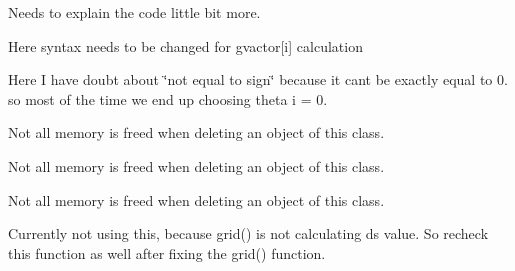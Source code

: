 
\begin{DoxyRefList}
\item[\label{bug__bug000002}%
\hypertarget{bug__bug000002}{}%
File \hyperlink{diffusionfluxinterface_8h}{diffusionfluxinterface.h} ]Needs to explain the code little bit more.  
\item[\label{bug__bug000003}%
\hypertarget{bug__bug000003}{}%
Member \hyperlink{classdiffusionfluxinterface_a30feb61f31b2c40063fc4ca7ca16258e}{diffusionfluxinterface\+:\+:diffusionfluxinterface} (vector$<$ double $>$ \&Conserved\+Variable\+Left\+Minus, vector$<$ double $>$ \&Conserved\+Variable\+Left, vector$<$ double $>$ \&Conserved\+Variable\+Right, vector$<$ double $>$ \&Conserved\+Variable\+Right\+Plus, vector$<$ double $>$ \&Face\+Area\+Vector\+Left, vector$<$ double $>$ \&Face\+Area\+Vector\+Right, vector$<$ double $>$ \&Face\+Area\+Vector\+Right\+Plus, double Cell\+Volume\+Left\+Mins, double Cell\+Volume\+Left, double Cell\+Volume\+Right, double Cell\+Volume\+Right\+Plus, double DeltaT)]Here syntax needs to be changed for gvactor\mbox{[}i\mbox{]} calculation 

Here I have doubt about \char`\"{}not equal to sign\char`\"{} because it can\textquotesingle{}t be exactly equal to 0. so most of the time we end up choosing theta i = 0.  
\item[\label{bug__bug000001}%
\hypertarget{bug__bug000001}{}%
File \hyperlink{eulerflux_8h}{eulerflux.h} ]Not all memory is freed when deleting an object of this class. 

Not all memory is freed when deleting an object of this class. 

Not all memory is freed when deleting an object of this class.  
\item[\label{bug__bug000007}%
\hypertarget{bug__bug000007}{}%
File \hyperlink{local__time__step_8h}{local\+\_\+time\+\_\+step.h} ]Currently not using this, because grid() is not calculating ds value. So recheck this function as well after fixing the grid() function. 
\end{DoxyRefList}